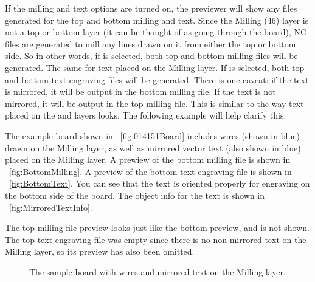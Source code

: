 \documentclass[11pt]{book}
\begin{document}
If the milling and text options are turned on, the previewer will show any files generated for the top and bottom milling and text. Since the Milling (46) layer is not a top or bottom layer (it can be thought of as going through the board), NC files are generated to mill any lines drawn on it from either the top or bottom side. So in other words, if  is selected, both top and bottom milling files will be generated. The same for text placed on the Milling layer. If  is selected, both top and bottom text engraving files will be generated. There is one caveat: if the text is mirrored, it will be output in the bottom milling file. If the text is not mirrored, it will be output in the top milling file. This is similar to the way text placed on the  and  layers looks. The following example will help clarify this.

The example board  shown in \figurename~\vref{fig:014151Board} includes wires (shown in blue) drawn on the Milling layer, as well as mirrored vector text (also shown in blue) placed on the Milling layer. A prewiew of the bottom milling file is shown in \figurename~\vref{fig:BottomMilling}. A preview of the bottom text engraving file is shown in \figurename~\vref{fig:BottomText}. You can see that the text is oriented properly for engraving on the bottom side of the board. The object info for the text is shown in \figurename~\vref{fig:MirroredTextInfo}.

The top milling file preview looks just like the bottom preview, and is not shown. The top text engraving file was empty since there is no non-mirrored text on the Milling layer, so its preview has also been omitted.

\begin{figure}
	\caption{The sample board  with wires and mirrored text on the Milling layer.}
	\label{fig:014151Board}
\end{figure}
\end{document}
